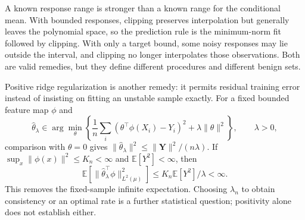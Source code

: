 \documentclass[11pt,twoside]{article}
\newcommand{\E}{\mathbb E}
\theoremstyle{definition}
\theoremstyle{remark}
\begin{document}
A known response range is stronger than a known range for the conditional
mean. With bounded responses, clipping preserves interpolation but generally
leaves the polynomial space, so the prediction rule is the minimum-norm fit
followed by clipping. With only a target bound, some noisy responses may lie
outside the interval, and clipping no longer interpolates those observations.
Both are valid remedies, but they define different procedures and different
benign sets.

Positive ridge regularization is another remedy: it permits residual
training error instead of insisting on fitting an unstable sample exactly.
For a fixed bounded feature map $\phi$ and
\[
 \widehat\theta_\lambda\in\arg\min_\theta
 \left\{\frac1n\sum_i(\theta^\top\phi(X_i)-Y_i)^2
                      +\lambda\|\theta\|^2\right\},\qquad\lambda>0,
\]
comparison with $\theta=0$ gives
$\|\widehat\theta_\lambda\|^2\le\|\mathbf Y\|^2/(n\lambda)$.
If $\sup_x\|\phi(x)\|^2\le K_n<\infty$ and $\E[Y^2]<\infty$, then
\[
 \E[\|\widehat\theta_\lambda^\top\phi\|_{L^2(\mu)}^2]
 \le K_n\E[Y^2]/\lambda<\infty.
\]
This removes the fixed-sample infinite expectation. Choosing $\lambda_n$ to
obtain consistency or an optimal rate is a further statistical question;
positivity alone does not establish either.
\end{document}
